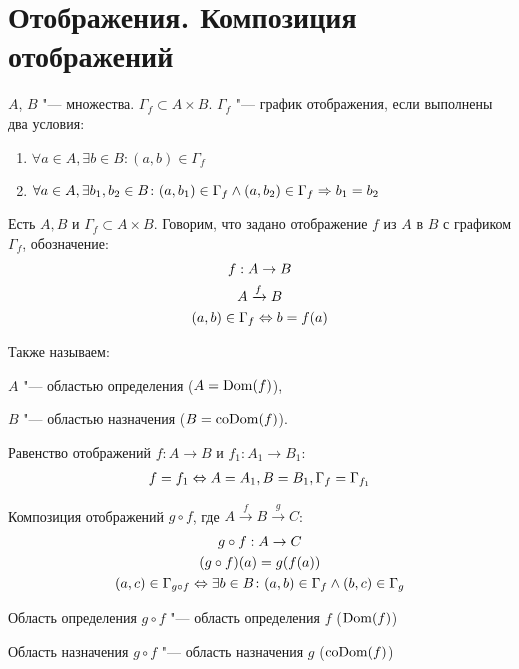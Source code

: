 ﻿\section{Отображения. Композиция отображений}

\begin{Def}
$A$, $B$ "--- множества. $\Gamma_{f} \subset A \times B$. $\Gamma_f$ "--- график отображения, если выполнены два условия:

\begin{enumerate}
\item $\forall a \in A, \exists b \in B \colon (a, b) \in \Gamma_{f}$
\item $\forall a \in A, \exists b_1, b_2 \in B\colon (a, b_1) \in \Gamma_f \wedge (a, b_2) \in \Gamma_f \Rightarrow b_1 = b_2$
\end{enumerate} 
\end{Def}

\begin{Def}
Есть $A, B$ и $\Gamma_f \subset A \times B$.
Говорим, что задано отображение $f$ из $A$ в $B$ с графиком $\Gamma_f$, обозначение:
\begin{gather*}
f:A \to B \\
A \xrightarrow{f} B \\
(a, b) \in \Gamma_f \Leftrightarrow b = f(a)
\end{gather*}

Также называем:

$A$ "--- областью определения ($A=\operatorname{Dom}(f)$),

$B$ "--- областью назначения ($B=\operatorname{coDom}(f)$).
\end{Def}

\begin{Def}
Равенство отображений $f: A \to B$ и $f_1: A_1 \to B_1$:
\begin{gather*}
f = f_1 \Leftrightarrow A = A_1, B = B_1, \Gamma_f = \Gamma_{f_1}
\end{gather*}
\end{Def}

\begin{Def}
Композиция отображений $g \circ f$, где $A \xrightarrow{f} B \xrightarrow{g} C$:
\begin{gather*}
g \circ f: A \to C \\
(g \circ f)(a) = g(f(a)) \\
(a, c) \in \Gamma_{g \circ f} \Leftrightarrow \exists b \in B \colon (a, b) \in \Gamma_{f} \wedge (b, c) \in \Gamma_g
\end{gather*}

Область определения $g \circ f$ "--- область определения $f$ ($\operatorname{Dom}(f)$)

Область назначения $g \circ f$ "--- область назначения $g$ ($\operatorname{coDom}(f)$)

\end{Def}

